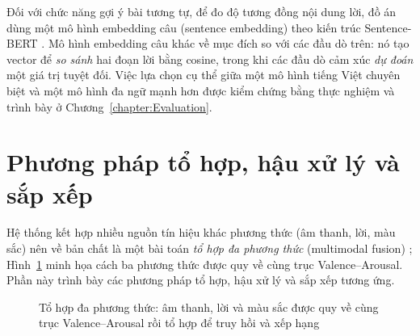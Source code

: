 \documentclass[../DoAn.tex]{subfiles}
\begin{document}
Đối với chức năng gợi ý bài tương tự, để đo độ tương đồng nội dung lời, đồ án dùng một mô hình embedding câu (sentence embedding) theo kiến trúc Sentence-BERT \cite{reimers2019sbert}. Mô hình embedding câu khác về mục đích so với các đầu dò trên: nó tạo vector để \textit{so sánh} hai đoạn lời bằng cosine, trong khi các đầu dò cảm xúc \textit{dự đoán} một giá trị tuyệt đối. Việc lựa chọn cụ thể giữa một mô hình tiếng Việt chuyên biệt \cite{dangvantuan2024vnembedding} và một mô hình đa ngữ mạnh hơn \cite{wang2024e5} được kiểm chứng bằng thực nghiệm và trình bày ở Chương~\ref{chapter:Evaluation}.

\section{Phương pháp tổ hợp, hậu xử lý và sắp xếp}
\label{section:3.5}
Hệ thống kết hợp nhiều nguồn tín hiệu khác phương thức (âm thanh, lời, màu sắc) nên về bản chất là một bài toán \textit{tổ hợp đa phương thức} (multimodal fusion) \cite{baltrusaitis2019multimodal}; Hình~\ref{fig:fusion} minh họa cách ba phương thức được quy về cùng trục Valence--Arousal. Phần này trình bày các phương pháp tổ hợp, hậu xử lý và sắp xếp tương ứng.

\begin{figure}[tbp]
\centering
{}
\caption{Tổ hợp đa phương thức: âm thanh, lời và màu sắc được quy về cùng trục Valence--Arousal rồi tổ hợp để truy hồi và xếp hạng}
\label{fig:fusion}
\end{figure}
\end{document}
